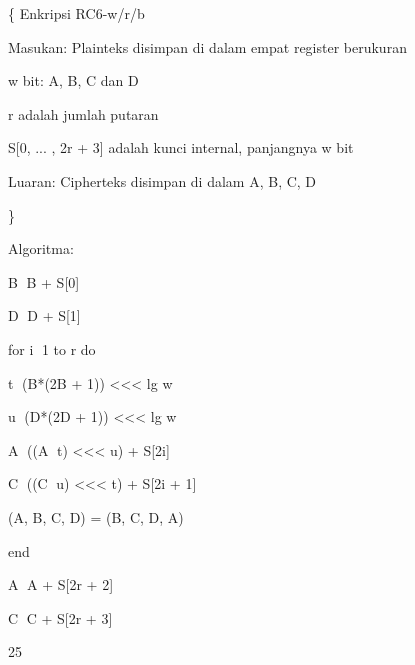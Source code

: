 \documentclass{article}
\begin{document}

\{ Enkripsi RC6-w/r/b

Masukan: Plainteks disimpan di dalam empat register berukuran

w bit: A, B, C dan D

r adalah jumlah putaran

S[0, ... , 2r + 3] adalah kunci internal, panjangnya w bit

Luaran: Cipherteks disimpan di dalam A, B, C, D

\}

Algoritma:

B B + S[0]

D D + S[1]

for i 1 to r do

t (B*(2B + 1)) <<< lg w

u (D*(2D + 1)) <<< lg w

A ((A t) <<< u) + S[2i]

C ((C u) <<< t) + S[2i + 1]

(A, B, C, D) = (B, C, D, A)

end

A A + S[2r + 2]

C C + S[2r + 3]

25
\end{document}
